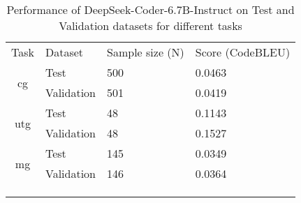 \begin{table}[H]
\centering
\caption{Performance of DeepSeek-Coder-6.7B-Instruct on Test and Validation datasets for different tasks}
\begin{tabular}{clll}
\cline{1-4}
\multicolumn{1}{|l|}{Task}                 & \multicolumn{1}{l|}{Dataset}    & \multicolumn{1}{l|}{Sample size (N)} & \multicolumn{1}{l|}{Score (CodeBLEU)} \\ \cline{1-4}
\multicolumn{1}{|c|}{\multirow{2}{*}{cg}}  & \multicolumn{1}{l|}{Test}       & \multicolumn{1}{l|}{500}             & \multicolumn{1}{l|}{0.0463}          \\ \cline{2-4}
\multicolumn{1}{|c|}{}                     & \multicolumn{1}{l|}{Validation} & \multicolumn{1}{l|}{501}             & \multicolumn{1}{l|}{0.0419}           \\ \cline{1-4}
\multicolumn{1}{|c|}{\multirow{2}{*}{utg}} & \multicolumn{1}{l|}{Test}       & \multicolumn{1}{l|}{48}              & \multicolumn{1}{l|}{0.1143}           \\ \cline{2-4}
\multicolumn{1}{|c|}{}                     & \multicolumn{1}{l|}{Validation} & \multicolumn{1}{l|}{48}              & \multicolumn{1}{l|}{0.1527}           \\ \cline{1-4}
\multicolumn{1}{|c|}{\multirow{2}{*}{mg}}  & \multicolumn{1}{l|}{Test}       & \multicolumn{1}{l|}{145}             & \multicolumn{1}{l|}{0.0349}           \\ \cline{2-4}
\multicolumn{1}{|c|}{}                     & \multicolumn{1}{l|}{Validation} & \multicolumn{1}{l|}{146}             & \multicolumn{1}{l|}{0.0364}           \\ \cline{1-4}
\multicolumn{1}{l}{}                       &                                 &                                      &                                       \\
\multicolumn{1}{l}{}                       &                                 &                                      &                                       \\
\multicolumn{1}{l}{}                       &                                 &                                      &                                      
\end{tabular}
\label{tab:CodeTaskEvalPreEval}
\end{table}